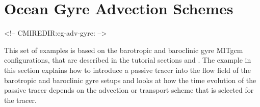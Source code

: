 


\section[Gyre Advection Example]{Ocean Gyre Advection Schemes}
\label{sect:eg-adv-gyre}
\label{www:tutorials}
\begin{rawhtml}
<!-- CMIREDIR:eg-adv-gyre: -->
\end{rawhtml}

This set of examples is based on the barotropic and baroclinic gyre MITgcm configurations,
that are described in the tutorial sections \label{sect:eg-baro} and \label{sect:eg-fourlayer}. 
The example in this section explains how to introduce a passive tracer into the flow 
field of the barotropic and baroclinic gyre setups and looks at how the time evolution
of the passive tracer depends on the advection or transport scheme that is selected 
for the tracer. 




